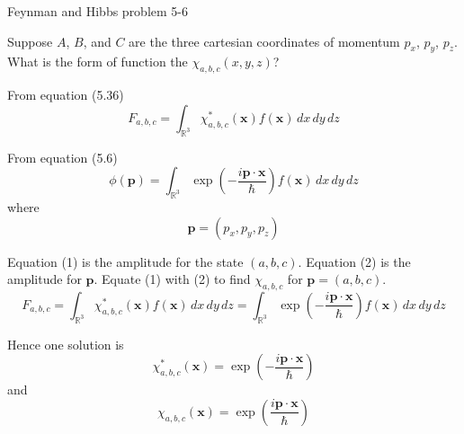 \documentclass[12pt]{article}
\newcommand\INT{\int_{\mathbb R^3}}
\begin{document}
\begin{center}
Feynman and Hibbs problem 5-6
\end{center}

Suppose $A$, $B$, and $C$ are the three cartesian coordinates
of momentum $p_x$, $p_y$, $p_z$.
What is the form of function the $\chi_{a,b,c}(x,y,z)$?

\bigskip
From equation (5.36)
\begin{equation*}
F_{a,b,c}=\INT\chi_{a,b,c}^*(\mathbf x)f(\mathbf x)\,dx\,dy\,dz
\tag{1}
\end{equation*}

From equation (5.6)
\begin{equation*}
\phi(\mathbf p)=\INT\exp\left(-\frac{i\mathbf p\cdot\mathbf x}{\hbar}\right)f(\mathbf x)\,dx\,dy\,dz
\tag{2}
\end{equation*}
where
\begin{equation*}
\mathbf p=(p_x,p_y,p_z)
\end{equation*}

Equation (1) is the amplitude for the state $(a,b,c)$.
Equation (2) is the amplitude for $\mathbf p$.
Equate (1) with (2) to find $\chi_{a,b,c}$ for $\mathbf p=(a,b,c)$.
\begin{equation*}
F_{a,b,c}=\INT\chi_{a,b,c}^*(\mathbf x)f(\mathbf x)\,dx\,dy\,dz
=\INT\exp\left(-\frac{i\mathbf p\cdot\mathbf x}{\hbar}\right)f(\mathbf x)\,dx\,dy\,dz
\end{equation*}

Hence one solution is
\begin{equation*}
\chi_{a,b,c}^*(\mathbf x)=\exp\left(-\frac{i\mathbf p\cdot\mathbf x}{\hbar}\right)
\end{equation*}
and
\begin{equation*}
\chi_{a,b,c}(\mathbf x)=\exp\left(\frac{i\mathbf p\cdot\mathbf x}{\hbar}\right)
\end{equation*}
\end{document}
